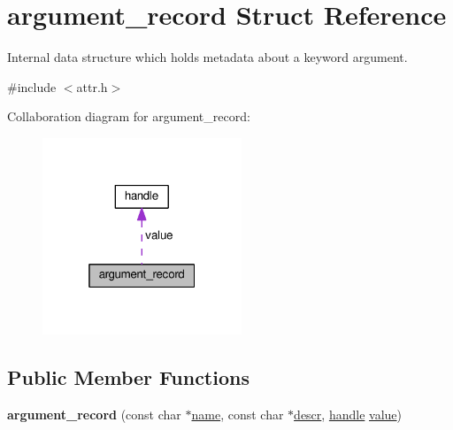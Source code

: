 \hypertarget{structargument__record}{}\section{argument\+\_\+record Struct Reference}
\label{structargument__record}


Internal data structure which holds metadata about a keyword argument.  




{\ttfamily \#include $<$attr.\+h$>$}



Collaboration diagram for argument\+\_\+record\+:
\nopagebreak
\begin{figure}[H]
\begin{center}
\leavevmode
\includegraphics[width=169pt]{structargument__record__coll__graph}
\end{center}
\end{figure}
\subsection*{Public Member Functions}
\begin{DoxyCompactItemize}
\item 
{\bfseries argument\+\_\+record} (const char $\ast$\hyperlink{structname}{name}, const char $\ast$\hyperlink{classdescr}{descr}, \hyperlink{classhandle}{handle} \hyperlink{structargument__record_a3d6ba6a0cb59834720cb7d7df5bdb2c2}{value})\hypertarget{structargument__record_ab6af4cf071371841db4e784cbb485458}{}\label{structargument__record_ab6af4cf071371841db4e784cbb485458}

\end{DoxyCompactItemize}
